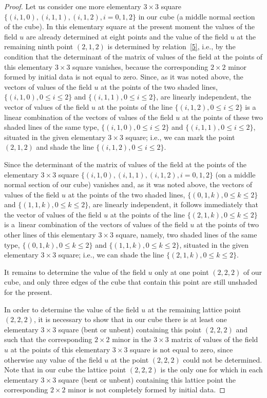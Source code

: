 \documentclass[pdftex]{sigma}
\begin{document}
\begin{proof}
Let us consider one more elementary $3 \times 3$ square $\{(i, 1,
0), (i, 1, 1), (i, 1, 2), i = 0, 1, 2\}$ in our cube (a middle
normal section of the cube). In this elementary square at the
present moment the values of the f\/ield $u$ are already determined at
eight points and the value of the f\/ield $u$ at the remaining ninth
point $(2, 1, 2)$ is determined by relation~\eqref{5}, i.e.,
by the condition that the determinant of the matrix of values of the
f\/ield at the points of this elementary $3 \times 3$ square vanishes,
because the corresponding $2 \times 2$ minor formed by initial data
is not equal to zero. Since, as it was noted above, the vectors of
values of the f\/ield $u$ at the points of the two shaded lines,
$\{(i, 1, 0), 0 \leq i \leq 2\}$ and $\{(i, 1, 1), 0 \leq i \leq
2\}$, are linearly independent, the vector of values of the f\/ield
$u$ at the points of the line $\{(i, 1, 2), 0 \leq i \leq 2\}$ is a
linear combination of the vectors of values of the f\/ield $u$ at the
points of these two shaded lines of the same type, $\{(i, 1, 0), 0
\leq i \leq 2\}$ and $\{(i, 1, 1), 0 \leq i \leq 2\}$, situated in
the given elementary $3 \times 3$ square; i.e., we can mark the
point $(2, 1, 2)$ and shade the line $\{(i, 1, 2), 0 \leq i \leq
2\}$.




Since the determinant of the matrix of values of the f\/ield at the
points of the elementary $3 \times 3$ square $\{(i, 1, 0), (i, 1,
1), (i, 1, 2), i = 0, 1, 2\}$ (on a middle normal section of our
cube) vanishes and, as it was noted above, the vectors of values of
the f\/ield $u$ at the points of the two shaded lines, $\{(0, 1, k), 0
\leq k \leq 2\}$ and $\{(1, 1, k), 0 \leq k \leq 2\}$, are linearly
independent, it follows immediately that the vector of values of the
f\/ield $u$ at the points of the line $\{(2, 1, k), 0 \leq k \leq 2\}$
is a~linear combination of the vectors of values of the f\/ield $u$ at
the points of two other lines of this elementary $3 \times 3$
square, namely, two shaded lines of the same type, $\{(0, 1, k), 0
\leq k \leq 2\}$ and $\{(1, 1, k), 0 \leq k \leq 2\}$, situated in
the given elementary $3 \times 3$ square; i.e., we can shade the
line $\{(2, 1, k), 0 \leq k \leq 2\}$.


It remains to determine the value of the f\/ield $u$ only at one point
$(2, 2, 2)$ of our cube, and only three edges of the cube that
contain this point are still unshaded for the present.


In order to determine the value of the f\/ield $u$ at the remaining
lattice point $(2, 2, 2)$, it is necessary to show that in our cube
there is at least one elementary $3 \times 3$ square (bent or
unbent) containing this point $(2, 2, 2)$ and such that the
corresponding $2 \times 2$ minor in the $3 \times 3$ matrix of
values of the f\/ield $u$ at the points of this elementary $3 \times
3$ square is not equal to zero, since otherwise any value of the
f\/ield $u$ at the point $(2, 2, 2)$ could not be determined. Note
that in our cube the lattice point $(2, 2, 2)$ is the only one for
which in each elementary $3 \times 3$ square (bent or unbent)
containing this lattice point the corresponding $2 \times 2$ minor
is not completely formed by initial data.



\end{proof}
\end{document}
